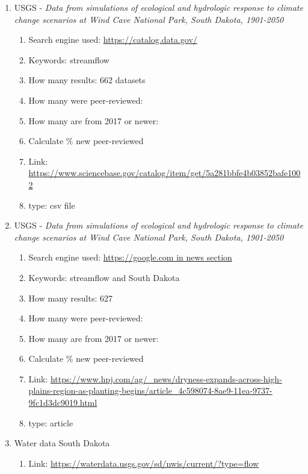 \documentclass{article}
\begin{document}
\begin{enumerate}
        
    \item USGS - \textit{Data from simulations of ecological and hydrologic response to climate change scenarios at Wind Cave National Park, South Dakota, 1901-2050}
        \begin{enumerate}
            \item Search engine used: \url{https://catalog.data.gov/}
            \item Keywords: streamflow 
            \item How many results: 662 datasets 
            \item How many were peer-reviewed: 
            \item How many are from 2017 or newer: 
            \item Calculate \% new peer-reviewed 
            \item Link: \url{https://www.sciencebase.gov/catalog/item/get/5a281bbfe4b03852bafe1002}
            \item type: csv file 
        \end{enumerate}


    \item USGS - \textit{Data from simulations of ecological and hydrologic response to climate change scenarios at Wind Cave National Park, South Dakota, 1901-2050}
        \begin{enumerate}
            \item Search engine used: \url{https://google.com in news section}
            \item Keywords: streamflow and South Dakota 
            \item How many results: 627 
            \item How many were peer-reviewed: 
            \item How many are from 2017 or newer: 
            \item Calculate \% new peer-reviewed 
            \item Link: \url{https://www.hpj.com/ag/_news/dryness-expands-across-high-plains-region-as-planting-begins/article_4c598074-8ae9-11ea-9737-9fc1d3dc9019.html}
            \item type: article 
        \end{enumerate}


    \item Water data South Dakota
        \begin{enumerate}
            \item Link: \url{https://waterdata.usgs.gov/sd/nwis/current/?type=flow}
        \end{enumerate}


\end{enumerate}
\end{document}
